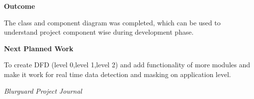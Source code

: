 \documentclass[12pt,a4paper]{article}
\begin{document}

\textbf{\large Outcome}

\vspace{4pt}

The class and component diagram was completed, which can be used to understand project component wise during development phase.

\vspace{8pt}


\textbf{\large Next Planned Work}

\vspace{4pt}

To create DFD (level 0,level 1,level 2) and add functionality of more modules and make it work for real time data detection and masking on application level.

\vfill


\begin{flushright}
    \textit{Blurguard Project Journal}
\end{flushright}
\end{document}
